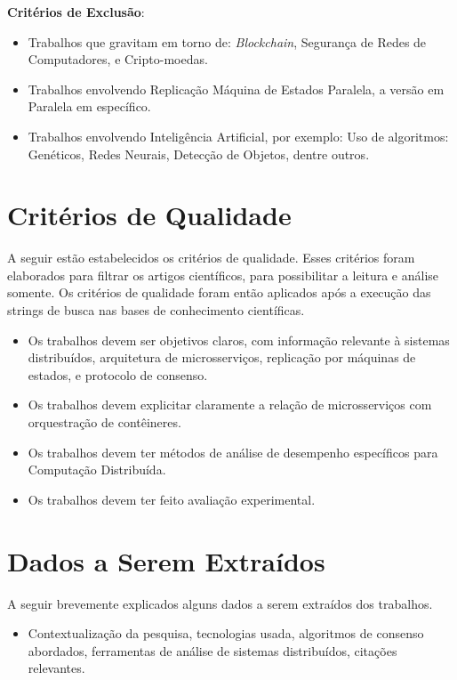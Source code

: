 \textbf{Critérios de Exclusão}:

\begin{itemize}
\item Trabalhos que gravitam em torno de: \textit{Blockchain}, Segurança de Redes de Computadores, e Cripto-moedas.
\item Trabalhos envolvendo Replicação Máquina de Estados Paralela, a versão em Paralela em específico.
\item Trabalhos envolvendo Inteligência Artificial, por exemplo: Uso de algoritmos: Genéticos, Redes Neurais, Detecção de Objetos, dentre outros.
\end{itemize}

\section{Critérios de Qualidade}

A seguir estão estabelecidos os critérios de qualidade. Esses critérios foram elaborados para filtrar os artigos científicos, para possibilitar a leitura e análise somente. Os critérios de qualidade foram então aplicados após a execução das strings de busca nas bases de conhecimento científicas.

\begin{itemize}
\item Os trabalhos devem ser objetivos claros, com informação relevante à sistemas distribuídos, arquitetura de microsserviços, replicação por máquinas de estados, e protocolo de consenso.
\item Os trabalhos devem explicitar claramente a relação de microsserviços com orquestração de contêineres.
\item Os trabalhos devem ter métodos de análise de desempenho específicos para Computação Distribuída.
\item Os trabalhos devem ter feito avaliação experimental.
\end{itemize}

\section{Dados a Serem Extraídos}

A seguir brevemente explicados alguns dados a serem extraídos dos trabalhos.

\begin{itemize}
\item Contextualização da pesquisa, tecnologias usada, algoritmos de consenso abordados, ferramentas de análise de sistemas distribuídos, citações relevantes.
\end{itemize}

